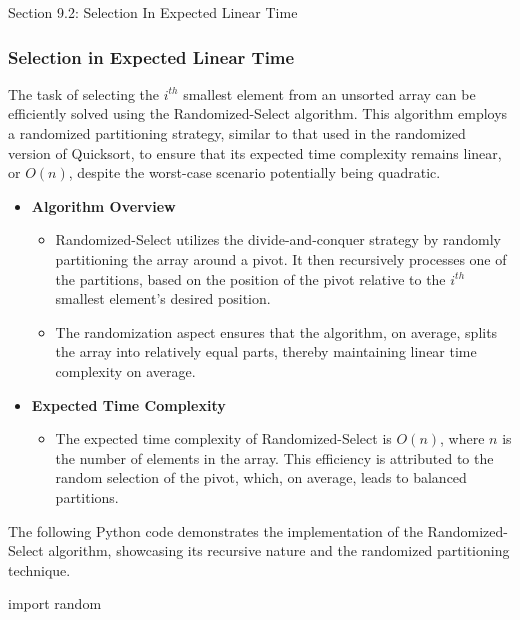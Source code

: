 \begin{notes}{Section 9.2: Selection In Expected Linear Time}
    \subsubsection*{Selection in Expected Linear Time}

    The task of selecting the $i^{th}$ smallest element from an unsorted array can be efficiently solved using the Randomized-Select algorithm. This algorithm employs a randomized partitioning 
    strategy, similar to that used in the randomized version of Quicksort, to ensure that its expected time complexity remains linear, or $O(n)$, despite the worst-case scenario potentially being quadratic.
    
    \begin{itemize}
        \item \textbf{Algorithm Overview}
        \begin{itemize}
            \item Randomized-Select utilizes the divide-and-conquer strategy by randomly partitioning the array around a pivot. It then recursively processes one of the partitions, based on the position 
            of the pivot relative to the $i^{th}$ smallest element's desired position.
            \item The randomization aspect ensures that the algorithm, on average, splits the array into relatively equal parts, thereby maintaining linear time complexity on average.
        \end{itemize}
        
        \item \textbf{Expected Time Complexity}
        \begin{itemize}
            \item The expected time complexity of Randomized-Select is $O(n)$, where $n$ is the number of elements in the array. This efficiency is attributed to the random selection of the pivot, which, on average, leads to balanced partitions.
        \end{itemize}
    \end{itemize}
    
    \begin{highlight}
        The following Python code demonstrates the implementation of the Randomized-Select algorithm, showcasing its recursive nature and the randomized partitioning technique.
    \begin{code}[Python]
    import random
    

\end{code}
\end{highlight}
\end{notes}
